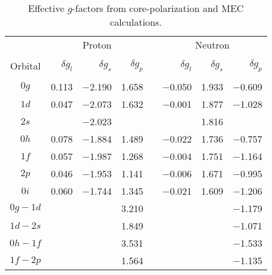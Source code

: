 \documentclass[aps,twocolumn,superscriptaddress,prc,showpacs]{revtex4}
\begin{document}
\begingroup
\begin{table*}
 \caption{\label{tab6}Effective $  g  $-factors from core-polarization and MEC calculations.}
\begin{ruledtabular}
\begin{tabular}{crrrcrrr}
 & \multicolumn{3}{c}{Proton} & & \multicolumn{3}{c}{Neutron} \\
\cline{2-4}
\cline{6-8}
 & & & & & & & \\ [-3mm]
Orbital & $  \delta g_{l}   $ & $  \delta g_{s}   $ & $  \delta g_{p}
$ & &
$  \delta g_{l}   $ & $  \delta g_{s}   $  & $  \delta g_{p}   $ \\
\hline \\ [-3mm]
  $  0g  $  &   0.113 & $-$2.190  &  1.658 & &
            $-$0.050 &   1.933 & $-$0.609  \\
  $  1d  $  &   0.047 & $-$2.073 &   1.632  & &
            $-$0.001  &  1.877 &  $-$1.028  \\
  $  2s  $  &  &         $-$2.023  & & &
                &  1.816  & \\
  $  0h  $  &    0.078 & $-$1.884 &    1.489 & &
            $-$0.022  &  1.736 & $-$0.757 \\
  $  1f  $  &    0.057 & $-$1.987 &    1.268 & &
            $-$0.004  &  1.751 & $-$1.164 \\
  $  2p  $  &    0.046 & $-$1.953 &    1.141 & &
            $-$0.006  &  1.671 & $-$0.995 \\
  $  0i  $  &    0.060 & $-$1.744 &    1.345 & &
            $-$0.021  &  1.609 & $-$1.206 \\
 $  0g-1d  $  & & &                   3.210 & &
          & &            $-$1.179 \\
 $  1d-2s  $  & & &                   1.849 & &
          & &            $-$1.071 \\
 $  0h-1f  $  & & &                   3.531 & &
          & &            $-$1.533 \\
 $  1f-2p  $  & & &                   1.564 & &
          & &            $-$1.135 \\
\end{tabular}
\end{ruledtabular}
\end{table*}
\endgroup
\end{document}
